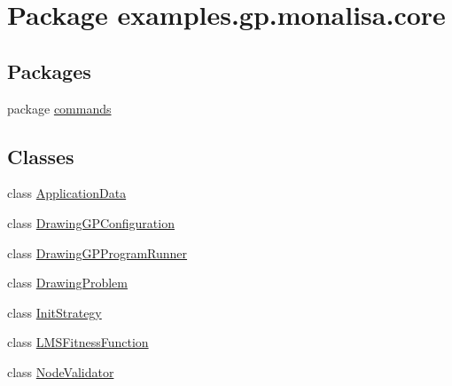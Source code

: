 \hypertarget{namespaceexamples_1_1gp_1_1monalisa_1_1core}{\section{Package examples.\-gp.\-monalisa.\-core}
\label{namespaceexamples_1_1gp_1_1monalisa_1_1core}
}
\subsection*{Packages}
\begin{DoxyCompactItemize}
\item 
package \hyperlink{namespaceexamples_1_1gp_1_1monalisa_1_1core_1_1commands}{commands}
\end{DoxyCompactItemize}
\subsection*{Classes}
\begin{DoxyCompactItemize}
\item 
class \hyperlink{classexamples_1_1gp_1_1monalisa_1_1core_1_1_application_data}{Application\-Data}
\item 
class \hyperlink{classexamples_1_1gp_1_1monalisa_1_1core_1_1_drawing_g_p_configuration}{Drawing\-G\-P\-Configuration}
\item 
class \hyperlink{classexamples_1_1gp_1_1monalisa_1_1core_1_1_drawing_g_p_program_runner}{Drawing\-G\-P\-Program\-Runner}
\item 
class \hyperlink{classexamples_1_1gp_1_1monalisa_1_1core_1_1_drawing_problem}{Drawing\-Problem}
\item 
class \hyperlink{classexamples_1_1gp_1_1monalisa_1_1core_1_1_init_strategy}{Init\-Strategy}
\item 
class \hyperlink{classexamples_1_1gp_1_1monalisa_1_1core_1_1_l_m_s_fitness_function}{L\-M\-S\-Fitness\-Function}
\item 
class \hyperlink{classexamples_1_1gp_1_1monalisa_1_1core_1_1_node_validator}{Node\-Validator}
\end{DoxyCompactItemize}
